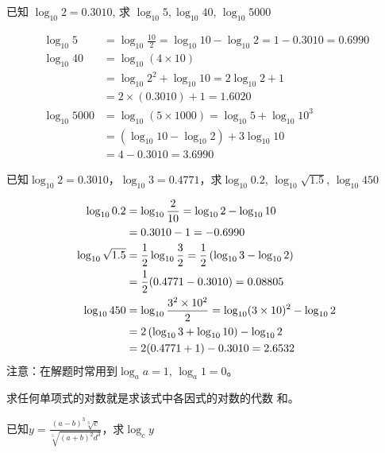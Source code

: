 \begin{example}
已知 $\log _{10} 2=0.3010$, 求 $\log_{10} 5, \log_{10} 40$,
    $\log_{10} 5000$
\end{example}

\begin{solution}
\[\begin{split}
  \log _{10} 5&=\log _{10} \frac{10}{2}=\log _{10} 10-\log _{10} 2=1-0.3010=0.6990 \\
   \log _{10} 40&=\log_{10}(4 \times 10)\\
   &=\log_{10} 2^{2}+\log_{10} 10=2 \log_{10} 2+1\\
    &=2 \times(0.3010)+1=1.6020\\
    \log _{10} 5000&=\log _{10}(5 \times 1000)=\log _{10} 5+\log _{10} 10^{3}\\
    &=\left(\log_{10} 10-\log_{10} 2\right)+3 \log _{10} 10\\
    &=4-0.3010=3.6990
\end{split}\]
\end{solution}


\begin{example}
已知$\log_{10}2=0.3010$，$\log_{10}3=0.4771$，求$\log _{10} 0.2$, $\log _{10} \sqrt{1.5}$, $\log _{10} 450$
\end{example}    

\begin{solution}
    \[\begin{split}
        \log _{10} 0.2 &=\log _{10} \dfrac{2}{10}=\log _{10} 2-\log _{10} 10\\ 
        &=0.3010-1 =-0.6990\\
        \log _{10} \sqrt{1.5} &=\dfrac{1}{2} \log _{10} \dfrac{3}{2}=\dfrac{1}{2}\left(\log _{10} 3-\log _{10} 2\right)\\
        &=\dfrac{1}{2}(0.4771-0.3010)=0.08805\\
        \log _{10} 450 &=\log_{10}\dfrac{3^2\times 10^2}{2}=\log_{10}(3\times 10)^2-\log_{10} 2\\
        &=2\left(\log_{10}3+\log_{10}10\right) -\log_{10}2\\
        &=2(0.4771+1)-0.3010=2.6532
\end{split}\]
注意：在解题时常用到$\log_a a=1$, $\log_a 1=0$。
\end{solution}    

求任何单项式的对数就是求该式中各因式的对数的代数
和。
    
\begin{example}
    已知$y=\frac{(a-b)^3\sqrt[3]{c}}{\sqrt[5]{(a+b)^2d^3}}$，求$\log_c y$
\end{example}

